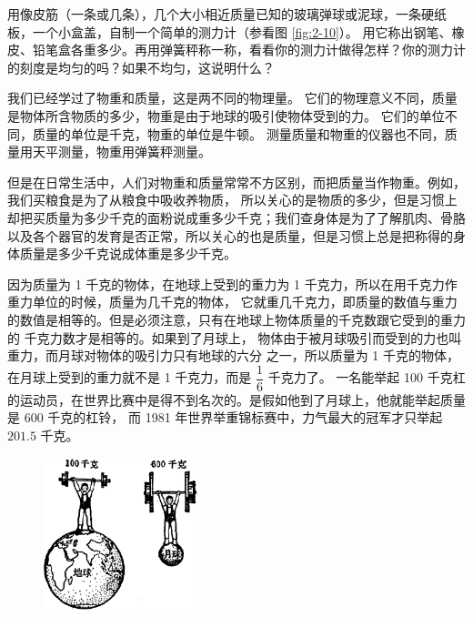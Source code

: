 用像皮筋（一条或几条），几个大小相近质量已知的玻璃弹球或泥球，一条硬纸板，一个小盒盖，自制一个简单的测力计（参看图 \ref{fig:2-10}）。
用它称出钢笔、橡皮、铅笔盒各重多少。再用弹簧秤称一称，看看你的测力计做得怎样？你的测力计的刻度是均匀的吗？如果不均匀，这说明什么？



我们已经学过了物重和质量，这是两不同的物理量。
它们的物理意义不同，质量是物体所含物质的多少，物重是由于地球的吸引使物体受到的力。
它们的单位不同，质量的单位是千克，物重的单位是牛顿。
测量质量和物重的仪器也不同，质量用天平测量，物重用弹簧秤测量。

但是在日常生活中，人们对物重和质量常常不方区别，而把质量当作物重。例如，我们买粮食是为了从粮食中吸收养物质，
所以关心的是物质的多少，但是习惯上却把买质量为多少千克的面粉说成重多少千克；我们查身体是为了了解肌肉、骨胳
以及各个器官的发育是否正常，所以关心的也是质量，但是习惯上总是把称得的身体质量是多少千克说成体重是多少千克。

因为质量为 1 千克的物体，在地球上受到的重力为 1 千克力，所以在用千克力作重力单位的时候，质量为几千克的物体，
它就重几千克力，即质量的数值与重力的数值是相等的。但是必须注意，只有在地球上物体质量的千克数跟它受到的重力的
千克力数才是相等的。如果到了月球上， 物体由于被月球吸引而受到的力也叫重力，而月球对物体的吸引力只有地球的六分
之一，所以质量为 1 千克的物体，在月球上受到的重力就不是 1 千克力，而是 $\dfrac{1}{6}$ 千克力了。
一名能举起 100 千克杠的运动员，在世界比赛中是得不到名次的。是假如他到了月球上，他就能举起质量是 600 千克的杠铃，
而 1981 年世界举重锦标赛中，力气最大的冠军才只举起 $201.5$ 千克。

\begin{figure}[H]
    \centering
    \includegraphics[width=0.4\textwidth]{../pic/czwl1-ch2-11}
    \caption{}\label{fig:2-11}
\end{figure}

